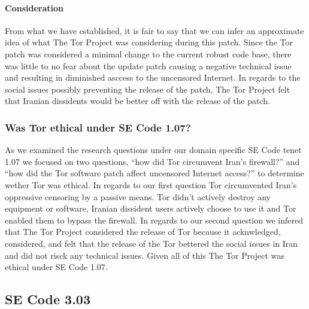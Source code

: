 \documentclass[11pt]{article}
\begin{document}
\begin{multicols}{2}
\paragraph{Consideration}

From what we have established, it is fair to say that we can infer an
approximate idea of what The Tor Project was considering during this patch.
Since the Tor patch was considered a minimal change to the current robust code
base, there was little to no fear about the update patch causing a negative
technical issue and resulting in diminished asccess to the uncensored Internet.
In regards to the social issues possibly preventing the release of the patch,
The Tor Project felt that Iranian dissidents would be better off with the
release of the patch.

\subsubsection{Was Tor ethical under SE Code 1.07?} 

As we examined the research questions under our domain specific SE Code tenet
1.07 we focused on two questions, ``how did Tor circumvent Iran's firewall?''
and ``how did the Tor software patch affect uncensored Internet access?'' to
determine wether Tor was ethical. In regards to our first question Tor
circumvented Iran's oppressive censoring by a passive means. Tor didn't actively
destroy any equipment or software, Iranian dissident users actively choose to
use it and Tor enabled them to bypass the firewall. In regards to our second
question we infered that The Tor Project considered the release of Tor because
it acknwledged, considered, and felt that the release of the Tor bettered the
social issues in Iran and did not risck any technical issues. Given all of this
The Tor Project was ethical under SE Code 1.07.

\subsection{SE Code 3.03}


\end{multicols}
\end{document}
